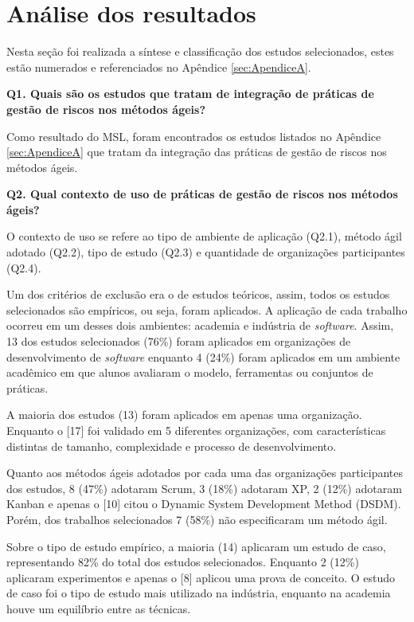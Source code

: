 \documentclass[
    12pt,       %
    openright,      %
    twoside,      %
    a4paper,      %
    english,      %
    french,       %
    spanish,      %
    brazil,       %
    ]{abntex2}
\begin{document}
\section{Análise dos resultados}

Nesta seção foi realizada a síntese e classificação dos estudos selecionados, estes estão numerados e referenciados no Apêndice \ref{sec:ApendiceA}.

\textbf{Q1. Quais são os estudos que tratam de integração de práticas de gestão de riscos nos métodos ágeis?}

Como resultado do MSL, foram encontrados os estudos listados no Apêndice \ref{sec:ApendiceA} que tratam da integração das práticas de gestão de riscos nos métodos ágeis.

\textbf{Q2. Qual contexto de uso de práticas de gestão de riscos nos métodos ágeis?}

O contexto de uso se refere ao tipo de ambiente de aplicação (Q2.1), método ágil adotado (Q2.2), tipo de estudo (Q2.3) e quantidade de organizações participantes (Q2.4).

Um dos critérios de exclusão era o de estudos teóricos, assim, todos os estudos selecionados são empíricos, ou seja, foram aplicados. A aplicação de cada trabalho ocorreu em um desses dois ambientes: academia e indústria de \textit{software}. Assim, 13 dos estudos selecionados (76\%) foram aplicados em organizações de desenvolvimento de \textit{software} enquanto 4 (24\%) foram aplicados em um ambiente acadêmico em que alunos avaliaram o modelo, ferramentas ou conjuntos de práticas. 

A maioria dos estudos (13) foram aplicados em apenas uma organização. Enquanto o [17] foi validado em 5 diferentes organizações, com características distintas de tamanho, complexidade e processo de desenvolvimento.

Quanto aos métodos ágeis adotados por cada uma das organizações participantes dos estudos, 8 (47\%) adotaram Scrum, 3 (18\%) adotaram XP, 2 (12\%) adotaram Kanban e apenas o [10] citou o Dynamic System Development Method (DSDM). Porém, dos trabalhos selecionados 7 (58\%) não especificaram um método ágil.

Sobre o tipo de estudo empírico, a maioria (14) aplicaram um estudo de caso, representando 82\% do total dos estudos selecionados. Enquanto 2 (12\%) aplicaram experimentos e apenas o [8] aplicou uma prova de conceito. O estudo de caso foi o tipo de estudo mais utilizado na indústria, enquanto na academia houve um equilíbrio entre as técnicas. 
\end{document}
